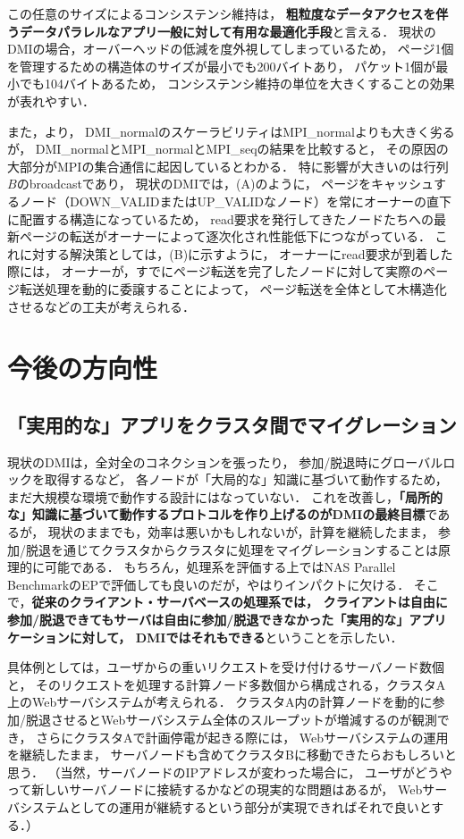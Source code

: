 \documentclass[10pt]{jsarticle}
\begin{document}
この任意のサイズによるコンシステンシ維持は，
\textbf{粗粒度なデータアクセスを伴うデータパラレルなアプリ一般に対して有用な最適化手段}と言える．
現状のDMIの場合，オーバーヘッドの低減を度外視してしまっているため，
ページ1個を管理するための構造体のサイズが最小でも200バイトあり，
パケット1個が最小でも104バイトあるため，
コンシステンシ維持の単位を大きくすることの効果が表れやすい．

また，より，
DMI\_normalのスケーラビリティはMPI\_normalよりも大きく劣るが，
DMI\_normalとMPI\_normalとMPI\_seqの結果を比較すると，
その原因の大部分がMPIの集合通信に起因しているとわかる．
特に影響が大きいのは行列$B$のbroadcastであり，
現状のDMIでは，(A)のように，
ページをキャッシュするノード（DOWN\_VALIDまたはUP\_VALIDなノード）を常にオーナーの直下に配置する構造になっているため，
read要求を発行してきたノードたちへの最新ページの転送がオーナーによって逐次化され性能低下につながっている．
これに対する解決策としては，(B)に示すように，
オーナーにread要求が到着した際には，
オーナーが，すでにページ転送を完了したノードに対して実際のページ転送処理を動的に委譲することによって，
ページ転送を全体として木構造化させるなどの工夫が考えられる．

\section{今後の方向性}

\subsection{「実用的な」アプリをクラスタ間でマイグレーション}

現状のDMIは，全対全のコネクションを張ったり，
参加/脱退時にグローバルロックを取得するなど，
各ノードが「大局的な」知識に基づいて動作するため，
まだ大規模な環境で動作する設計にはなっていない．
これを改善し，\textbf{「局所的な」知識に基づいて動作するプロトコルを作り上げるのがDMIの最終目標}であるが，
現状のままでも，効率は悪いかもしれないが，計算を継続したまま，
参加/脱退を通じてクラスタからクラスタに処理をマイグレーションすることは原理的に可能である．
もちろん，処理系を評価する上ではNAS Parallel BenchmarkのEPで評価しても良いのだが，やはりインパクトに欠ける．
そこで，\textbf{従来のクライアント・サーバベースの処理系では，
クライアントは自由に参加/脱退できてもサーバは自由に参加/脱退できなかった「実用的な」アプリケーションに対して，
DMIではそれもできる}ということを示したい．

具体例としては，ユーザからの重いリクエストを受け付けるサーバノード数個と，
そのリクエストを処理する計算ノード多数個から構成される，クラスタA上のWebサーバシステムが考えられる．
クラスタA内の計算ノードを動的に参加/脱退させるとWebサーバシステム全体のスループットが増減するのが観測でき，
さらにクラスタAで計画停電が起きる際には，
Webサーバシステムの運用を継続したまま，
サーバノードも含めてクラスタBに移動できたらおもしろいと思う．
（当然，サーバノードのIPアドレスが変わった場合に，
ユーザがどうやって新しいサーバノードに接続するかなどの現実的な問題はあるが，
Webサーバシステムとしての運用が継続するという部分が実現できればそれで良いとする．）
\end{document}
